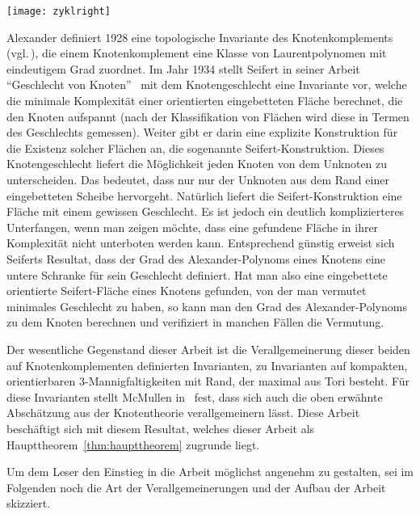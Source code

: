 	\hfill
	\begin{minipage}[t]{0.2\textwidth}
	\vfill \begin{flushright}
		\texttt{[image: zyklright]} 
	\end{flushright}
	\end{minipage}

	Alexander definiert 1928 eine topologische Invariante des Knotenkomplements (vgl.\,\cite{Alexander.1928}), die einem Knotenkomplement eine Klasse von Laurentpolynomen mit eindeutigem Grad zuordnet. Im Jahr 1934 stellt Seifert in seiner Arbeit "`Geschlecht von Knoten"'~\cite{Seifert.1934} mit dem Knotengeschlecht eine Invariante vor, welche die minimale Komplexität einer orientierten eingebetteten Fläche berechnet, die den Knoten aufspannt (nach der Klassifikation von Flächen wird diese in Termen des Geschlechts gemessen). Weiter gibt er darin eine explizite Konstruktion für die Existenz solcher Flächen an, die sogenannte Seifert-Konstruktion. Dieses Knotengeschlecht liefert die Möglichkeit jeden Knoten von dem Unknoten zu unterscheiden. Das bedeutet, dass nur nur der Unknoten aus dem Rand einer eingebetteten Scheibe hervorgeht. Natürlich liefert die Seifert-Konstruktion eine Fläche mit einem gewissen Geschlecht. Es ist jedoch ein deutlich komplizierteres Unterfangen, wenn man zeigen möchte, dass eine gefundene Fläche in ihrer Komplexität nicht unterboten werden kann. Entsprechend günstig erweist sich Seiferts Resultat, dass der Grad des Alexander-Polynoms eines Knotens eine untere Schranke für sein Geschlecht definiert. Hat man also eine eingebettete orientierte Seifert-Fläche eines Knotens gefunden, von der man vermutet minimales Geschlecht zu haben, so kann man den Grad des Alexander-Polynoms zu dem Knoten berechnen und verifiziert in manchen Fällen die Vermutung.

	Der wesentliche Gegenstand dieser Arbeit ist die Verallgemeinerung dieser beiden auf Knotenkomplementen definierten Invarianten, zu Invarianten auf kompakten, orientierbaren 3-Mannigfaltigkeiten mit Rand, der maximal aus Tori besteht. Für diese Invarianten stellt McMullen in~\cite{MCMULLEN.2002} fest, dass sich auch die oben erwähnte Abschätzung aus der Knotentheorie verallgemeinern lässt. Diese Arbeit beschäftigt sich mit diesem Resultat, welches dieser Arbeit als Haupttheorem~\ref{thm:haupttheorem} zugrunde liegt.

	Um dem Leser den Einstieg in die Arbeit möglichst angenehm zu gestalten, sei im Folgenden noch die Art der Verallgemeinerungen und der Aufbau der Arbeit skizziert.

